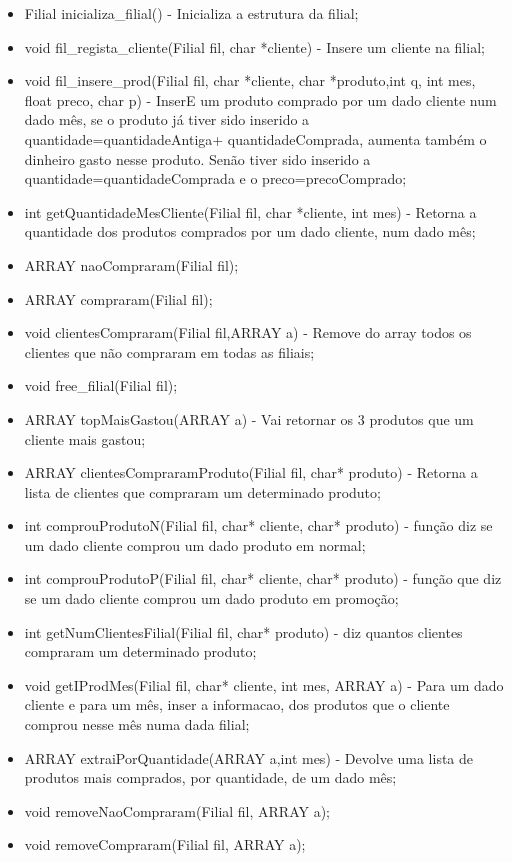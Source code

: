 \begin{itemize}
\item	Filial inicializa\_filial() - Inicializa a estrutura da filial; 

\item	void fil\_regista\_cliente(Filial fil, char *cliente) - Insere um cliente na filial; 

\item	void fil\_insere\_prod(Filial fil, char *cliente, char *produto,int q, int mes, float preco, char p) - InserE um produto comprado por um dado cliente num dado mês, se o produto já tiver sido inserido a quantidade=quantidadeAntiga+
quantidadeComprada, aumenta também o dinheiro gasto nesse produto. Senão tiver sido inserido a quantidade=quantidadeComprada e o 
preco=precoComprado;
 
\item	int getQuantidadeMesCliente(Filial fil, char *cliente, int mes) - Retorna a quantidade dos produtos comprados por um dado cliente, num dado mês; 

\item	ARRAY naoCompraram(Filial fil);
\item	ARRAY compraram(Filial fil);
\item	void clientesCompraram(Filial fil,ARRAY a) - Remove do array todos os clientes que não compraram em todas as filiais; 
\item	void free\_filial(Filial fil);
\item	ARRAY topMaisGastou(ARRAY a) - Vai retornar os 3 produtos que um cliente mais gastou; 
\item	ARRAY clientesCompraramProduto(Filial fil, char* produto) - Retorna a lista de clientes que compraram um determinado produto; 

\item	int comprouProdutoN(Filial fil, char* cliente, char* produto) - função  diz se um dado cliente comprou um dado produto em normal;

\item	int comprouProdutoP(Filial fil, char* cliente, char* produto) - função que diz se um dado cliente comprou um dado produto em promoção; 

\item	int getNumClientesFilial(Filial fil, char* produto) - diz quantos clientes compraram um determinado produto; 

\item	void getIProdMes(Filial fil, char* cliente, int mes, ARRAY a) - Para um dado cliente e para um mês, inser a informacao, dos produtos que o cliente comprou nesse mês numa dada filial; 
\item	ARRAY extraiPorQuantidade(ARRAY a,int mes) - Devolve uma lista de produtos mais comprados, por quantidade, de um dado mês; 
\item	void removeNaoCompraram(Filial fil, ARRAY a);
\item	void removeCompraram(Filial fil, ARRAY a);
\end{itemize}


